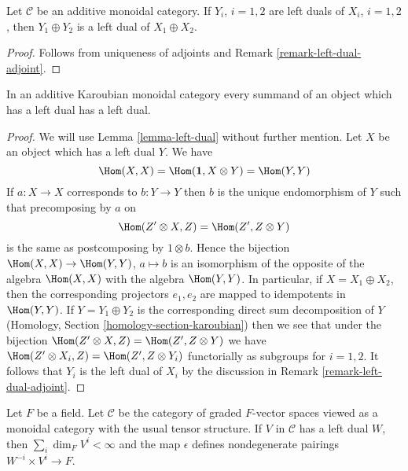 \begin{lemma}
\label{lemma-additive-dual}
Let $\mathcal{C}$ be an additive monoidal category.
If $Y_i$, $i = 1, 2$ are left duals of $X_i$, $i = 1, 2$, then
$Y_1 \oplus Y_2$ is a left dual of $X_1 \oplus X_2$.
\end{lemma}

\begin{proof}
Follows from uniqueness of adjoints and Remark \ref{remark-left-dual-adjoint}.
\end{proof}

\begin{lemma}
\label{lemma-Karoubian-dual}
In an additive Karoubian monoidal category every summand
of an object which has a left dual has a left dual.
\end{lemma}

\begin{proof}
We will use Lemma \ref{lemma-left-dual} without further mention.
Let $X$ be an object which has a left dual $Y$. We have
$$
\Hom(X, X) = \Hom(\mathbf{1}, X \otimes Y) = \Hom(Y, Y)
$$
If $a : X \to X$ corresponds to $b : Y \to Y$ then $b$ is the unique
endomorphism of $Y$ such that precomposing by $a$ on
$$
\Hom(Z' \otimes X, Z) = \Hom(Z', Z \otimes Y)
$$
is the same as postcomposing by $1 \otimes b$.
Hence the bijection $\Hom(X, X) \to \Hom(Y, Y)$, $a \mapsto b$
is an isomorphism of the opposite of the algebra $\Hom(X, X)$ with
the algebra $\Hom(Y, Y)$. In particular, if $X = X_1 \oplus X_2$, then
the corresponding projectors $e_1, e_2$ are mapped to idempotents
in $\Hom(Y, Y)$. If $Y = Y_1 \oplus Y_2$ is the corresponding direct
sum decomposition of $Y$ (Homology, Section \ref{homology-section-karoubian})
then we see that under the bijection
$\Hom(Z' \otimes X, Z) = \Hom(Z', Z \otimes Y)$
we have $\Hom(Z' \otimes X_i, Z) = \Hom(Z', Z \otimes Y_i)$
functorially as subgroups for $i = 1, 2$.
It follows that $Y_i$ is the left dual of
$X_i$ by the discussion in Remark \ref{remark-left-dual-adjoint}.
\end{proof}

\begin{lemma}
\label{lemma-left-dual-graded-vector-spaces}
Let $F$ be a field. Let $\mathcal{C}$ be the category of graded
$F$-vector spaces viewed as a monoidal category
with the usual tensor structure. If $V$ in $\mathcal{C}$
has a left dual $W$, then $\sum_i \dim_F V^i < \infty$
and the map $\epsilon$ defines nondegenerate pairings
$W^{-i} \times V^i \to F$.
\end{lemma}


